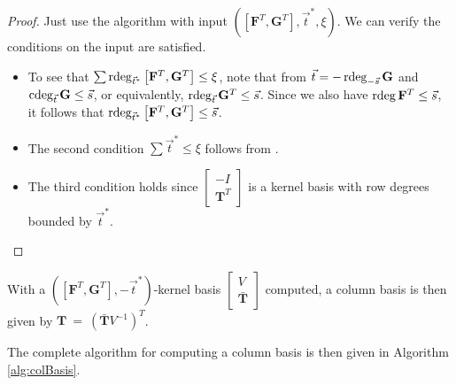 \begin{proof}
Just use the algorithm with input $\left(\left[\mathbf{F}^{T},\mathbf{G}^{T}\right],\vec{t}^{*},\xi\right)$.
We can verify the conditions on the input are satisfied.
\begin{itemize}
\item To see that $\sum\rdeg_{\vec{t}^{*}}\left[\mathbf{F}^{T},\mathbf{G}^{T}\right]\le\xi$,
note that from $\vec{t}=-\rdeg_{-\vec{s}}\mathbf{G}$ and 
$\cdeg_{\vec{t}}\mathbf{G}\le\vec{s}$, or equivalently, $\rdeg_{\vec{t}}\mathbf{G}^{T}\le\vec{s}$.
Since we also have $\rdeg\mathbf{F}^{T}\le\vec{s}$, it follows that
$\rdeg_{\vec{t}^{*}}\left[\mathbf{F}^{T},\mathbf{G}^{T}\right]\le\vec{s}$. 
\item The second condition $\sum\vec{t}^{*}\le\xi$ follows from .
\item The third condition holds since $\begin{bmatrix}-I\\
\mathbf{T}^{T}
\end{bmatrix}$ is a kernel basis with row degrees bounded by $\vec{t}^{*}$.
\end{itemize}
\end{proof}
With a $\left(\left[\mathbf{F}^{T},\mathbf{G}^{T}\right],-\vec{t}^{*}\right)$-kernel
basis $\begin{bmatrix}V\\
\bar{\mathbf{T}}
\end{bmatrix}$ computed, a column basis is then given by $\mathbf{T}~=~\left(\bar{\mathbf{T}}V^{-1}\right)^{T}$.

The complete algorithm for computing a column basis is then given
in Algorithm \ref{alg:colBasis}.

